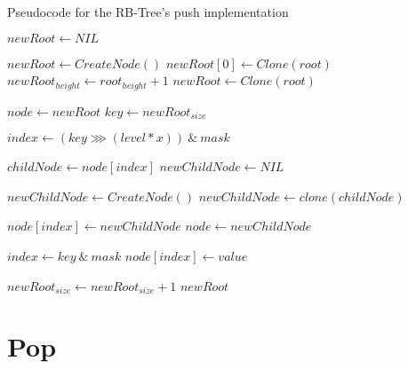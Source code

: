 \begin{listing}[ht!]    
    \label{lst:rb-tree-push}
    \caption{Pseudocode for the RB-Tree's push implementation}
    
    \begin{algorithmic}
            \State $newRoot \leftarrow NIL$

                \State $newRoot \leftarrow CreateNode()$
                \State $newRoot[0] \leftarrow Clone(root)$
                \State $newRoot_{height} \leftarrow root_{height} + 1$
            \Else 
                \State $newRoot \leftarrow Clone(root)$
            \EndIf
                        
            \State $node \leftarrow newRoot$
            \State $key \leftarrow newRoot_{size}$
    
                \State $index \leftarrow (key \ggg (level * x))\ \&\ mask$
                
                \State $childNode \leftarrow node[index]$
                \State $newChildNode \leftarrow NIL$

                    \State $newChildNode \leftarrow CreateNode()$
                \Else
                    \State $newChildNode \leftarrow clone(childNode)$
                \EndIf
                
                \State $node[index] \leftarrow newChildNode$
                \State $node \leftarrow newChildNode$
            \EndFor        
    
            \State $index \leftarrow key\ \&\ mask$
            \State $node[index] \leftarrow value$ 

            \State $newRoot_{size} \leftarrow newRoot_{size} + 1$
            \State \Return $newRoot$
        \EndFunction
    \end{algorithmic}
\end{listing}

\section{Pop}
